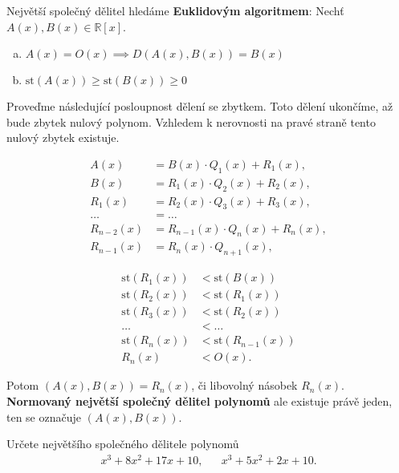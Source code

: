 \begin{pozn}
  Největší společný dělitel hledáme \textbf{Euklidovým algoritmem}: Nechť $A(x), B(x) \in \mathbb R [x]$.
  \begin{enumerate}[a.]
    \item $A(x) = O(x) \implies D(A(x), B(x)) = B(x)$
    \item $\text{st}(A(x)) \geq \text{st}(B(x)) \geq 0$
  \end{enumerate}
  Proveďme následující posloupnost dělení se zbytkem. Toto dělení ukončíme, až bude zbytek nulový polynom.
  Vzhledem k nerovnosti na pravé straně tento nulový zbytek existuje.

  \begin{minipage}{0.6\textwidth}
  \begin{align*}
    A(x) & = B(x) \cdot Q_1(x) + R_1(x),  \\
    B(x) & = R_1(x) \cdot Q_2(x) + R_2(x),  \\
    R_1(x) & = R_2(x) \cdot Q_3(x) + R_3(x), \\
    \dots & = \dots \\
    R_{n-2}(x) & = R_{n-1}(x) \cdot Q_n(x) + R_n(x),  \\
    R_{n-1}(x) & = R_{n}(x) \cdot Q_{n+1}(x),
  \end{align*}
  \end{minipage}
  \hfill
  \begin{minipage}{0.38\textwidth}
  \begin{align*}
   \text{st}(R_1(x)) & < \text{st}(B(x)) \\
   \text{st}(R_2(x)) & < \text{st}(R_1(x)) \\
 \text{st}(R_3(x)) & < \text{st}(R_2(x)) \\
    \dots & < \dots \\
 \text{st}(R_n(x)) & < \text{st}(R_{n-1}(x)) \\
   R_{n}(x) & < O(x).
  \end{align*}
  \end{minipage}

  Potom $(A(x), B(x)) = R_n(x)$, či libovolný násobek $R_n(x)$. \textbf{Normovaný největší společný dělitel polynomů}
  ale existuje právě jeden, ten se označuje $(A(x), B(x))$.
\end{pozn}

\begin{priklad}
    Určete největšího společného dělitele polynomů
    \begin{align*}
        x^3+8x^2+17x+10,& &   x^3+5x^2+2x+10.
    \end{align*}
\end{priklad}

